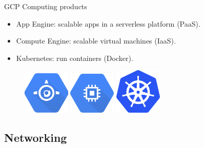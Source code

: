 \documentclass{beamer}
\begin{document}
\begin{frame}[fragile]{GCP Computing products}
  \begin{itemize}[<+->]
    \item App Engine: scalable apps in a serverless platform (PaaS).
    \item Compute Engine: scalable virtual machines (IaaS).
    \item Kubernetes: run containers (Docker).
  \end{itemize}
  \vspace{1cm}
  \begin{figure}[H]
    \includegraphics[width=0.2\textwidth]{img/app_engine}
    \hspace{1cm}   \includegraphics[width=0.2\textwidth]{img/compute_engine}
    \hspace{1cm}
     \includegraphics[width=0.2\textwidth]{img/kubernetes}
  \end{figure}

\end{frame}

\subsection{Networking}
\end{document}
